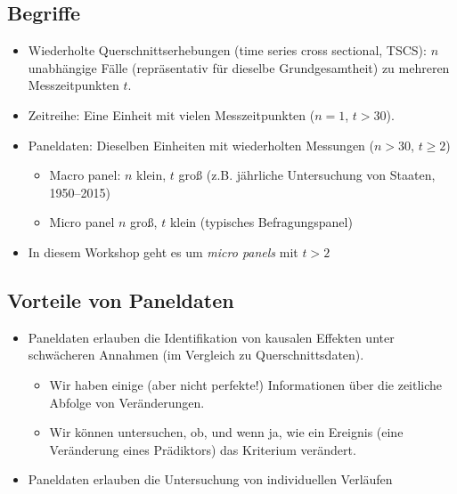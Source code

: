 \documentclass[]{book}
\providecommand{\tightlist}{%
  \setlength{\itemsep}{0pt}\setlength{\parskip}{0pt}}
\begin{document}
\hypertarget{begriffe}{%
\subsection*{Begriffe}\label{begriffe}}

\begin{itemize}
\tightlist
\item
  Wiederholte Querschnittserhebungen (time series cross sectional, TSCS): \(n\) unabhängige Fälle (repräsentativ für dieselbe Grundgesamtheit) zu mehreren Messzeitpunkten \(t\).
\item
  Zeitreihe: Eine Einheit mit vielen Messzeitpunkten (\(n = 1\), \(t > 30\)).
\item
  Paneldaten: Dieselben Einheiten mit wiederholten Messungen (\(n > 30\), \(t \ge 2\))

  \begin{itemize}
  \tightlist
  \item
    Macro panel: \(n\) klein, \(t\) groß (z.B. jährliche Untersuchung von Staaten, 1950--2015)
  \item
    Micro panel \(n\) groß, \(t\) klein (typisches Befragungspanel)
  \end{itemize}
\item
  In diesem Workshop geht es um \emph{micro panels} mit \(t > 2\)
\end{itemize}

\hypertarget{vorteile-von-paneldaten}{%
\subsection*{Vorteile von Paneldaten}\label{vorteile-von-paneldaten}}

\begin{itemize}
\tightlist
\item
  Paneldaten erlauben die Identifikation von kausalen Effekten unter schwächeren Annahmen (im Vergleich zu Querschnittsdaten).

  \begin{itemize}
  \tightlist
  \item
    Wir haben einige (aber nicht perfekte!) Informationen über die zeitliche Abfolge von Veränderungen.
  \item
    Wir können untersuchen, ob, und wenn ja, wie ein Ereignis (eine Veränderung eines Prädiktors) das Kriterium verändert.
  \end{itemize}
\item
  Paneldaten erlauben die Untersuchung von individuellen Verläufen
\end{itemize}
\end{document}

